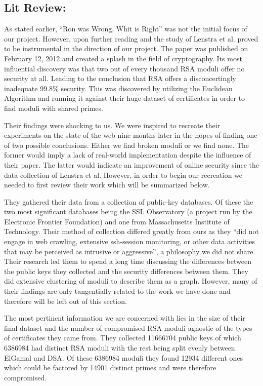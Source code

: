 \documentclass[11pt,twoside]{article}
\begin{document}
\begin{multicols}{2}
\section{Lit Review:}
As stated earlier, ``Ron was Wrong, Whit is Right'' was not the initial focus of
our project. However, upon further reading and the study of Lenstra et al.
proved to be instrumental in the direction of our project. The paper was
published on February 12, 2012 and created a splash in the field of
cryptography. Its most influential discovery was that two out of every thousand
RSA moduli offer no security at all. Leading to the conclusion that RSA offers a
disconcertingly inadequate 99.8\% security. This was discovered by utilizing the
Euclidean Algorithm and running it against their huge dataset of certificates in
order to find moduli with shared primes.

Their findings were shocking to us. We were inspired to recreate their
experiments on the state of the web nine months later in the hopes of finding
one of two possible conclusions. Either we find broken moduli or we find none.
The former would imply a lack of real-world implementation despite the influence
of their paper. The latter would indicate an improvement of online security
since the data collection of Lenstra et al. However, in order to begin our
recreation we needed to first review their work which will be summarized below.

They gathered their data from a collection of public-key databases. Of these the
two most significant databases being the SSL Observatory (a project run by the
Electronic Frontier Foundation) and one  from Massachusetts Institute of
Technology. Their method of collection differed greatly from ours as they ``did
not engage in web crawling, extensive ssh-session monitoring, or other data
activities that may be perceived as intrusive or aggressive'', a philosophy we
did not share. Their research led them to spend a long time discussing the
differences between the public keys they collected and the security differences
between them. They did extensive clustering of moduli to describe them as a
graph. However, many of their findings are only tangentially related to the work
we have done and therefore will be left out of this section.

The most pertinent information we are concerned with lies in the size of their
final dataset and the number of compromised RSA moduli agnostic of the types of
certificates they came from. They collected 11666704 public keys of which
6386984 had distinct RSA moduli with the rest being split evenly between
ElGamal and DSA. Of these 6386984 moduli they found 12934 different ones which
could be factored by 14901 distinct primes and were therefore compromised.


\end{multicols}
\end{document}
